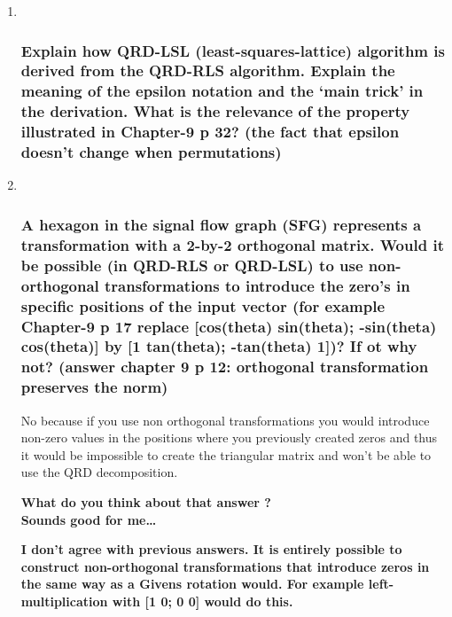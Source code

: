 \documentclass[
  a4paper,
  ,captions=tableheading
]{scrartcl}
\begin{document}
\begin{enumerate}
\def\labelenumi{\arabic{enumi}.}
\item ~
  \subsubsection{Explain how QRD-LSL (least-squares-lattice) algorithm
  is derived from the QRD-RLS algorithm. Explain the meaning of the
  epsilon notation and the `main trick' in the derivation. What is the
  relevance of the property illustrated in Chapter-9 p 32? (the fact
  that epsilon doesn't change when
  permutations)}\label{explain-how-qrd-lsl-least-squares-lattice-algorithm-is-derived-from-the-qrd-rls-algorithm.-explain-the-meaning-of-the-epsilon-notation-and-the-main-trick-in-the-derivation.-what-is-the-relevance-of-the-property-illustrated-in-chapter-9-p-32-the-fact-that-epsilon-doesnt-change-when-permutations}
\item ~
  \subsubsection{A hexagon in the signal flow graph (SFG) represents a
  transformation with a 2-by-2 orthogonal matrix. Would it be possible
  (in QRD-RLS or QRD-LSL) to use non-orthogonal transformations to
  introduce the zero's in specific positions of the input vector (for
  example Chapter-9 p 17 replace {[}cos(theta) sin(theta); -sin(theta)
  cos(theta){]} by {[}1 tan(theta); -tan(theta) 1{]})? If ot why not?
  (answer chapter 9 p 12: orthogonal transformation preserves the
  norm)}\label{a-hexagon-in-the-signal-flow-graph-sfg-represents-a-transformation-with-a-2-by-2-orthogonal-matrix.-would-it-be-possible-in-qrd-rls-or-qrd-lsl-to-use-non-orthogonal-transformations-to-introduce-the-zeros-in-specific-positions-of-the-input-vector-for-example-chapter-9-p-17-replace-costheta-sintheta--sintheta-costheta-by-1-tantheta--tantheta-1-if-ot-why-not-answer-chapter-9-p-12-orthogonal-transformation-preserves-the-norm}

  No because if you use non orthogonal transformations you would
  introduce non-zero values in the positions where you previously
  created zeros and thus it would be impossible to create the triangular
  matrix and won't be able to use the QRD decomposition.

  \textbf{What do you think about that answer ?}\\
  \textbf{Sounds good for me\ldots{}}

  \textbf{I don't agree with previous answers. It is entirely possible
  to construct non-orthogonal transformations that introduce zeros in
  the same way as a Givens rotation would. For example
  left-multiplication with {[}1 0; 0 0{]} would do this.}


\end{enumerate}
\end{document}
